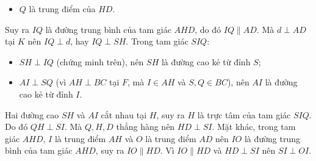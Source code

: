 \begin{bt}
{\begin{enumerate}[a)]
\begin{itemize}
		\item $Q$ là trung điểm của $HD$.
	\end{itemize}
	Suy ra $IQ$ là đường trung bình của tam giác $AHD$, do đó $IQ \parallel AD$.
	Mà $d \perp AD$ tại $K$ nên $IQ \perp d$, hay $IQ \perp SH$.
	Trong tam giác $SIQ$:
	\begin{itemize}
		\item $SH \perp IQ$ (chứng minh trên), nên $SH$ là đường cao kẻ từ đỉnh $S$;
		\item $AI \perp SQ$ (vì $AH \perp BC$ tại $F$, mà $I \in AH$ và $S, Q \in BC$), nên $AI$ là đường cao kẻ từ đỉnh $I$.
	\end{itemize}
	Hai đường cao $SH$ và $AI$ cắt nhau tại $H$, suy ra $H$ là trực tâm của tam giác $SIQ$.
	Do đó $QH \perp SI$. Mà $Q, H, D$ thẳng hàng nên $HD \perp SI$.
	Mặt khác, trong tam giác $AHD$, $I$ là trung điểm $AH$ và $O$ là trung điểm $AD$ nên $IO$ là đường trung bình của tam giác $AHD$, suy ra $IO \parallel HD$.
	Vì $IO \parallel HD$ và $HD \perp SI$ nên $SI \perp OI$.
\end{enumerate}
}
\end{bt}
